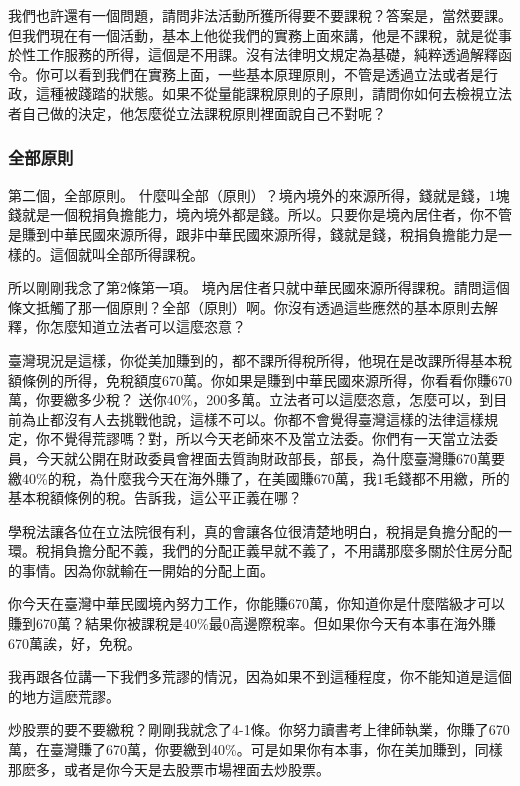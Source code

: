 \documentclass[oneside,sub3section]{ctexbook}
\begin{document}
我們也許還有一個問題，請問非法活動所獲所得要不要課稅？答案是，當然要課。但我們現在有一個活動，基本上他從我們的實務上面來講，他是不課稅，就是從事於性工作服務的所得，這個是不用課。沒有法律明文規定為基礎，純粹透過解釋函令。你可以看到我們在實務上面，一些基本原理原則，不管是透過立法或者是行政，這種被踐踏的狀態。如果不從量能課稅原則的子原則，請問你如何去檢視立法者自己做的決定，他怎麼從立法課稅原則裡面說自己不對呢？

\hypertarget{ux5168ux90e8ux539fux5247}{%
\subsubsection{全部原則}\label{ux5168ux90e8ux539fux5247}}

第二個，全部原則。
什麼叫全部（原則）？境內境外的來源所得，錢就是錢，1塊錢就是一個稅捐負擔能力，境內境外都是錢。所以。只要你是境內居住者，你不管是賺到中華民國來源所得，跟非中華民國來源所得，錢就是錢，稅捐負擔能力是一樣的。這個就叫全部所得課稅。

所以剛剛我念了第2條第一項。
境內居住者只就中華民國來源所得課稅。請問這個條文抵觸了那一個原則？全部（原則）啊。你沒有透過這些應然的基本原則去解釋，你怎麼知道立法者可以這麼恣意？

臺灣現況是這樣，你從美加賺到的，都不課所得稅所得，他現在是改課所得基本稅額條例的所得，免稅額度670萬。你如果是賺到中華民國來源所得，你看看你賺670萬，你要繳多少稅？ 送你40\%，200多萬。立法者可以這麼恣意，怎麼可以，到目前為止都沒有人去挑戰他說，這樣不可以。你都不會覺得臺灣這樣的法律這樣規定，你不覺得荒謬嗎？對，所以今天老師來不及當立法委。你們有一天當立法委員，今天就公開在財政委員會裡面去質詢財政部長，部長，為什麼臺灣賺670萬要繳40\%的稅，為什麼我今天在海外賺了，在美國賺670萬，我1毛錢都不用繳，所的基本稅額條例的稅。告訴我，這公平正義在哪？

學稅法讓各位在立法院很有利，真的會讓各位很清楚地明白，稅捐是負擔分配的一環。稅捐負擔分配不義，我們的分配正義早就不義了，不用講那麼多關於住房分配的事情。因為你就輸在一開始的分配上面。

你今天在臺灣中華民國境內努力工作，你能賺670萬，你知道你是什麼階級才可以賺到670萬？結果你被課稅是40\%最0高邊際稅率。但如果你今天有本事在海外賺670萬誒，好，免稅。

我再跟各位講一下我們多荒謬的情況，因為如果不到這種程度，你不能知道是這個的地方這麽荒謬。

炒股票的要不要繳稅？剛剛我就念了4-1條。你努力讀書考上律師執業，你賺了670萬，在臺灣賺了670萬，你要繳到40\%。可是如果你有本事，你在美加賺到，同樣那麽多，或者是你今天是去股票市場裡面去炒股票。
\end{document}
